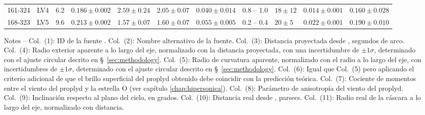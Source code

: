 \begin{table}
\begin{tabular}{llrllllrlll}
 161-324  & LV4      &   6.2  &  $0.186 \pm 0.002$  &  $2.59 \pm 0.24$   &  $2.05 \pm 0.07$     &  $0.040 \pm 0.014$  &  0.8 -- 1.0  &  $18 \pm 12$  &  $0.014 \pm 0.001$  &  $0.160 \pm 0.028$  \\
 168-323  & LV5      &   9.6  &  $0.213 \pm 0.002$  &  $1.57 \pm 0.07$   &  $1.60 \pm 0.07$     &  $0.055 \pm 0.005$  &  0.2 -- 0.4  &  $20 \pm 5$   &  $0.022 \pm 0.001$  &  $0.190 \pm 0.010$  \\
\bottomrule
\end{tabular}
\begin{minipage}{0.95\linewidth}
  Notes --
%
  Col.~(1): ID de la fuente \citep{ODell:1994a}.
%
  Col.~(2): Nombre alternativo de la fuente.
% 
  Col.~(3): Distancia proyectada desde \thC{}, segundos de arco.
%
  Col.~(4): Radio exterior aparente a lo largo del eje, normalizado con la distancia proyectada, con una incertidumbre de \(\pm 1\sigma\), determinado con el ajuste circular decrito en \S~\ref{sec:methodology}.
% 
  Col.~(5): Radio de curvatura aparente, normalizado con el radio a lo largo del eje, con incertidumbres de \(\pm 1\sigma\), determinado con el ajuste circular descrito en \S~\ref{sec:methodology}.
% 
  Col.~(6): Igual que Col.~(5) pero aplicando el criterio adicional de que el brillo superficial del proplyd obtenido debe coincidir con la predicción teórica.
%
  Col.~(7): Cociente de momentos entre el viento del proplyd y la estrella O (ver capítulo \ref{chap:hipersonica}). 
% 
  Col.~(8): Parámetro de anisotropía del viento del proplyd.
% 
  Col.~(9): Inclinación respecto al plano del cielo, en grados.
% 
  Col.~(10): Distancia real desde \thC{}, parsecs.
%
  Col.~(11): Radio real de la cáscara a lo largo del eje, normalizado con distancia.

\end{minipage}
\end{table}
